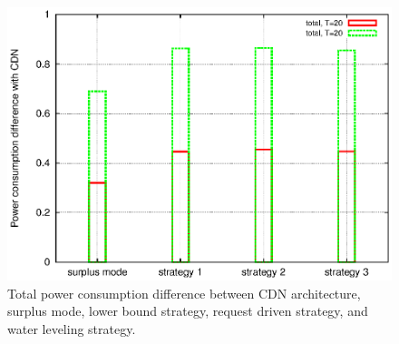 \documentclass[conference]{IEEEtran}
\begin{document}
\begin{figure}[ht]
\begin{minipage}[b]{0.3\linewidth}
	\includegraphics[scale=0.4]{graphs/diff-cdn.eps}
	\caption{Total power consumption difference between CDN architecture, surplus mode, lower bound strategy, request driven strategy, and water leveling strategy.}
	\label{fig:difftocdn}
\end{minipage}
\label{fig:diffstrategy}
\end{figure}
\end{document}
